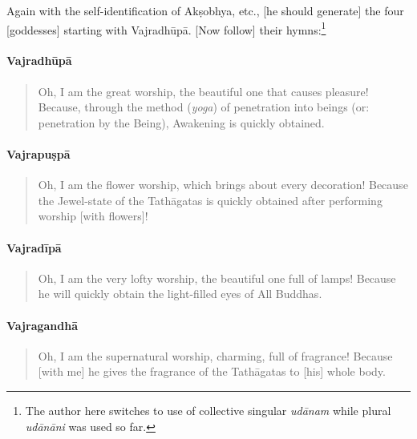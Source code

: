 \documentclass[11pt]{book}
\newcommand{\skt}[1]{\emph{#1}}
\begin{document}
Again with the self-identification of Akṣobhya, etc., [he should generate] the four [goddesses] starting with Vajradhūpā. [Now follow] their hymns:\footnote{The author here switches to use of collective singular \skt{udānam} while plural \skt{udānāni} was used so far.}

\paragraph{Vajradhūpā}

\begin{verse}
Oh, I am the great worship, the beautiful one that causes pleasure! Because, through the method (\emph{yoga}) of penetration into beings (or: penetration by the Being), Awakening is quickly obtained.
\end{verse}

\paragraph{Vajrapuṣpā}

\begin{verse}
Oh, I am the flower worship, which brings about every decoration! Because the Jewel-state of the Tathāgatas is quickly obtained after performing worship [with flowers]!

\end{verse}

\paragraph{Vajradīpā}

\begin{verse}
Oh, I am the very lofty worship, the beautiful one full of lamps! Because he will quickly obtain the light-filled eyes of All Buddhas.
\end{verse}

\paragraph{Vajragandhā}

\begin{verse}
Oh, I am the supernatural worship, charming, full of fragrance! Because [with me] he gives the fragrance of the Tathāgatas to [his] whole body.
\end{verse}
\end{document}
